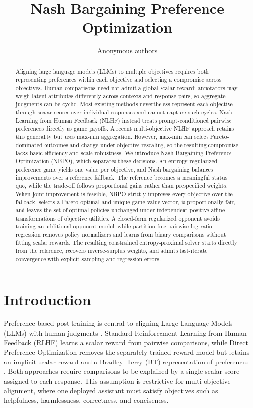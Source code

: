 \documentclass{article}
\title{Nash Bargaining Preference Optimization}
\author{Anonymous authors}
\theoremstyle{remark}
\theoremstyle{plain}
\begin{document}
\maketitle

\begin{abstract}
Aligning large language models (LLMs) to multiple objectives requires both representing preferences within each objective and selecting a compromise across objectives. Human comparisons need not admit a global scalar reward: annotators may weigh latent attributes differently across contexts and response pairs, so aggregate judgments can be cyclic. Most existing methods nevertheless represent each objective through scalar scores over individual responses and cannot capture such cycles. Nash Learning from Human Feedback (NLHF) instead treats prompt-conditioned pairwise preferences directly as game payoffs. A recent multi-objective NLHF approach retains this generality but uses max-min aggregation. However, max-min can select Pareto-dominated outcomes and change under objective rescaling, so the resulting compromise lacks basic efficiency and scale robustness. We introduce Nash Bargaining Preference Optimization (NBPO), which separates these decisions. An entropy-regularized preference game yields one value per objective, and Nash bargaining balances improvements over a reference fallback. The reference becomes a meaningful status quo, while the trade-off follows proportional gains rather than prespecified weights. When joint improvement is feasible, NBPO strictly improves every objective over the fallback, selects a Pareto-optimal and unique game-value vector, is proportionally fair, and leaves the set of optimal policies unchanged under independent positive affine transformations of objective utilities. A closed-form regularized opponent avoids training an additional opponent model, while partition-free pairwise log-ratio regression removes policy normalizers and learns from binary comparisons without fitting scalar rewards. The resulting constrained entropy-proximal solver starts directly from the reference, recovers inverse-surplus weights, and admits last-iterate convergence with explicit sampling and regression errors.
\end{abstract}

\section{Introduction}
\label{sec:intro}
Preference-based post-training is central to aligning Large Language Models (LLMs) with human judgments \citep{christiano2017deep,ouyang2022training}. Standard Reinforcement Learning from Human Feedback (RLHF) learns a scalar reward from pairwise comparisons, while Direct Preference Optimization removes the separately trained reward model but retains an implicit scalar reward and a Bradley--Terry (BT) representation of preferences \citep{rafailov2023direct,bradley1952rank}. Both approaches require comparisons to be explained by a single scalar score assigned to each response. This assumption is restrictive for multi-objective alignment, where one deployed assistant must satisfy objectives such as helpfulness, harmlessness, correctness, and conciseness.
\end{document}
